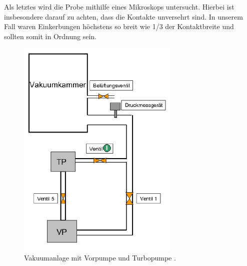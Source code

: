 \documentclass[twoside,        %
               BCOR12mm,       %
               english,ngerman, %
               fleqn,headsepline=false,footsepline=false
              ]{Vorlage/MFPREPORT}
\begin{document}
Als letztes wird die Probe mithilfe eines Mikroskops untersucht. Hierbei ist
insbesondere darauf zu achten, dass die Kontakte unversehrt sind. In unserem
Fall waren Einkerbungen höchstens so breit wie 1/3 der Kontaktbreite und
sollten somit in Ordnung sein.
\begin{figure}[]
    \centering
    \includegraphics{fig/vakuum.png}
    \caption{Vakuumanlage mit Vorpumpe und Turbopumpe \cite{fprakt}.}
    \label{fig:vakuum}
\end{figure}
\end{document}
